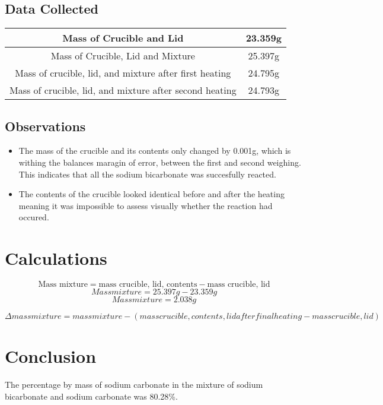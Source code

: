 \documentclass[titlepage][fleqn]{article}
\begin{document}
\subsection{Data Collected}
\begin{table}[h]
\def\arraystretch{1.5}
\begin{tabular}{|c|c|}
\hline
 Mass of Crucible and Lid & 23.359g \\ 
\hline
Mass of Crucible, Lid and Mixture & 25.397g\\  
\hline
Mass of crucible, lid, and mixture after first heating & 24.795g\\
\hline
Mass of crucible, lid, and mixture after second heating & 24.793g\\
\hline
\end{tabular}
\end{table}

\subsection{Observations}
\begin{itemize}
  \item The mass of the crucible and its contents only changed by 0.001g, which is withing the balances maragin of error, between the first and second weighing. This indicates that all the sodium bicarbonate was succesfully reacted. 
  \item The contents of the crucible looked identical before and after the heating meaning it was impossible to assess visually whether the reaction had occured. 
\end{itemize}

\section{Calculations}



$$\mbox{Mass mixture} = \mbox{mass crucible, lid, contents} - \mbox{mass crucible, lid}$$
$$Mass mixture = 25.397g  - 23.359g$$
$$Mass mixture = 2.038g$$


$$\Delta mass mixture = mass mixture - (mass crucible, contents, lid after final heating - mass crucible, lid)$$



\section{Conclusion}

The percentage by mass of sodium carbonate in the mixture of sodium bicarbonate and sodium carbonate was 80.28\%. 
\end{document}
